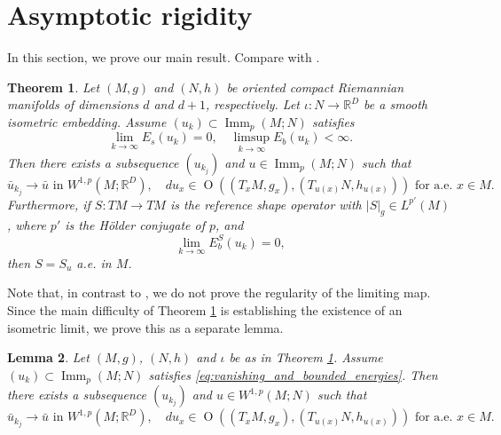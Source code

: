 \documentclass{article}
\numberwithin{equation}{section}
\newtheorem{theorem}{Theorem}[section]
\newtheorem{lemma}[theorem]{Lemma}
\theoremstyle{definition}
\theoremstyle{remark}
\DeclareMathOperator{\Imm}{Imm}
\DeclareMathOperator{\Ort}{O}
\begin{document}
\section{Asymptotic rigidity}

In this section, we prove our main result. Compare with \cite[Theorem 1.1]{AKM2}.

\begin{theorem} \label{thm:asymptotic_rigidity}
        Let $(M, g)$ and $(N, h)$ be oriented compact Riemannian manifolds of dimensions $d$ and $d + 1$, respectively. Let $\iota : N \to \mathbb{R}^D$ be a smooth isometric embedding. Assume $(u_k) \subset \Imm_p(M; N)$ satisfies
        \begin{equation} \label{eq:vanishing_and_bounded_energies}
            \lim_{k \to \infty} E_s(u_k) = 0, \quad \limsup_{k \to \infty} E_b(u_k) < \infty.
        \end{equation}
        Then there exists a subsequence $(u_{k_j})$ and $u \in \Imm_p(M; N)$ such that
        \begin{equation} \label{eq:convergence_to_local_isometry}
            \bar{u}_{k_j} \to \bar{u} \text{ in } W^{1, p}(M; \mathbb{R}^D), \quad du_x \in \Ort((T_xM, g_x), (T_{u(x)}N, h_{u(x)})) \text{ for a.e. } x \in M.
        \end{equation}
        Furthermore, if $S : TM \rightarrow TM$ is the reference shape operator with $|S|_g \in L^{p'}(M)$, where $p'$ is the Hölder conjugate of $p$, and
        \begin{equation}
            \lim_{k \to \infty} E_b^S(u_k) = 0,
        \end{equation}
        then $S = S_u$ a.e. in $M$.
\end{theorem}

Note that, in contrast to \cite[Theorem 1.1]{AKM2}, we do not prove the regularity of the limiting map. Since the main difficulty of Theorem  \ref{thm:asymptotic_rigidity} is establishing the existence of an isometric limit, we prove this as a separate lemma.

\begin{lemma} \label{lm:existence_of_the_limit}
    Let $(M, g)$, $(N, h)$ and $\iota$ be as in Theorem \ref{thm:asymptotic_rigidity}. Assume $(u_k) \subset \Imm_p(M; N)$ satisfies \eqref{eq:vanishing_and_bounded_energies}. Then there exists a subsequence $(u_{k_j})$ and $u \in W^{1, p}(M; N)$ such that
    \[
    \bar{u}_{k_j} \to \bar{u} \text{ in } W^{1, p}(M; \mathbb{R}^D), \quad du_x \in \Ort((T_xM, g_x), (T_{u(x)}N, h_{u(x)})) \text{ for a.e. } x \in M.
    \]
\end{lemma}
\end{document}
